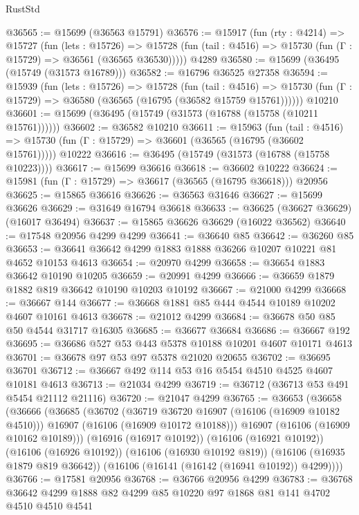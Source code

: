 \begin{lexlean}{RustStd}
\begin{coremodule}
@36565 := @15699 (@36563 @15791)
@36576 := @15917
    (fun (rty : @4214) =>
    @15727
      (fun (lets : @15726) =>
      @15728 (fun (tail : @4516) => @15730 (fun (Γ : @15729) => @36561 (@36565 @36530)))))
    @4289
@36580 := @15699 (@36495 (@15749 (@31573 @16789)))
@36582 := @16796 @36525 @27358
@36594 := @15939
    (fun (lets : @15726) =>
    @15728
      (fun (tail : @4516) =>
      @15730 (fun (Γ : @15729) => @36580 (@36565 (@16795 (@36582 @15759 @15761))))))
    @10210
@36601 := @15699 (@36495 (@15749 (@31573 (@16788 (@15758 (@10211 @15761))))))
@36602 := @36582 @10210
@36611 := @15963
    (fun (tail : @4516) => @15730 (fun (Γ : @15729) => @36601 (@36565 (@16795 (@36602 @15761)))))
    @10222
@36616 := @36495 (@15749 (@31573 (@16788 (@15758 @10223))))
@36617 := @15699 @36616
@36618 := @36602 @10222
@36624 := @15981 (fun (Γ : @15729) => @36617 (@36565 (@16795 @36618))) @20956
@36625 := @15865 @36616
@36626 := @36563 @31646
@36627 := @15699 @36626
@36629 := @31649 @16794 @36618
@36633 := @36625 (@36627 @36629) (@16017 @36494)
@36637 := @15865 @36626 @36629 (@16022 @36562)
@36640 := @17548 @20956 @4299 @4299
@36641 := @36640 @85
@36642 := @36260 @85
@36653 := @36641 @36642 @4299 @1883 @1888 @36266 @10207 @10221 @81 @4652 @10153 @4613
@36654 := @20970 @4299
@36658 := @36654 @1883 @36642 @10190 @10205
@36659 := @20991 @4299
@36666 := @36659 @1879 @1882 @819 @36642 @10190 @10203 @10192
@36667 := @21000 @4299
@36668 := @36667 @144
@36677 := @36668 @1881 @85 @444 @4544 @10189 @10202 @4607 @10161 @4613
@36678 := @21012 @4299
@36684 := @36678 @50 @85 @50 @4544 @31717 @16305
@36685 := @36677 @36684
@36686 := @36667 @192
@36695 := @36686 @527 @53 @443 @5378 @10188 @10201 @4607 @10171 @4613
@36701 := @36678 @97 @53 @97 @5378 @21020 @20655
@36702 := @36695 @36701
@36712 := @36667 @492 @114 @53 @16 @5454 @4510 @4525 @4607 @10181 @4613
@36713 := @21034 @4299
@36719 := @36712 (@36713 @53 @491 @5454 @21112 @21116)
@36720 := @21047 @4299
@36765 := @36653
    (@36658
      (@36666
        (@36685
          (@36702
            (@36719 @36720 @16907 (@16106 (@16909 @10182 @4510)))
            @16907
            (@16106 (@16909 @10172 @10188)))
          @16907
          (@16106 (@16909 @10162 @10189)))
        (@16916 (@16917 @10192))
        (@16106 (@16921 @10192))
        (@16106 (@16926 @10192))
        (@16106 (@16930 @10192 @819))
        (@16106 (@16935 @1879 @819 @36642))
        (@16106 (@16141 (@16142 (@16941 @10192)) @4299))))
@36766 := @17581 @20956
@36768 := @36766 @20956 @4299
@36783 := @36768 @36642 @4299 @1888 @82 @4299 @85 @10220 @97 @1868 @81 @141 @4702 @4510 @4510 @4541

\end{coremodule}
\end{lexlean}
